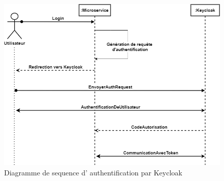 \documentclass[a4paper, 11pt, openany]{report}
\begin{document}
\begin{figure}[H]
\centering
\includegraphics[width=\textwidth]{assets/images/keycloak-seq.png} 
\caption{Diagramme de sequence d' authentification par Keycloak}
\label{fig:s2_auth}
\end{figure}
\end{document}
